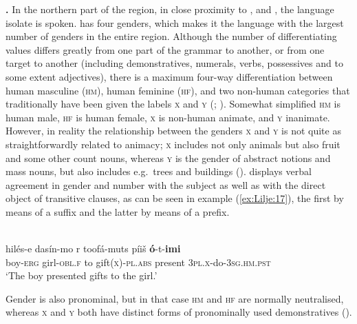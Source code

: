 \documentclass[output=collectionpaper]{langsci/langscibook}
\begin{document}
\textbf{.} In the northern part of the region, in close proximity to  ,   and  , the language isolate  is spoken.  has four genders, which makes it the language with the largest number of genders in the entire region. Although the number of differentiating values differs greatly from one part of the grammar  to another, or from one target to another (including demonstratives, numerals, verbs, possessives and to some extent adjectives), there is a maximum four-way differentiation between human masculine (\textsc{hm}), human feminine (\textsc{hf}), and two non-human categories that traditionally have been given the labels \textsc{x} and \textsc{y} (\citealt[8--9]{Willson1996}; \citealt[33--34]{Berger1998}). Somewhat simplified \textsc{hm} is human male, \textsc{hf} is human female, \textsc{x} is non-human animate, and \textsc{y} inanimate. However, in reality the relationship between the genders \textsc{x} and \textsc{y} is not quite as straightforwardly related to animacy; \textsc{x} includes not only animals but also fruit and some other count nouns, whereas \textsc{y} is the gender of abstract notions and mass nouns, but also includes e.g.\ trees and buildings (\citealt[32--33]{Yoshioka2012}).  displays verbal agreement in gender and number with the subject as well as with the direct object of transitive clauses, as can be seen in example (\ref{ex:Lilje:17}), the first by means of a suffix and the latter by means of a prefix.

\ea
\label{ex:Lilje:17}
 \citep[17]{Willson1996}\\
\gll hilés-e dasín-mo r toofá-muts píiš \textbf{ó}{}-t-\textbf{imi}   \\
boy-\textsc{erg} girl-\textsc{obl.f} to gift\textsc{(x)-pl.abs} present \textsc{3pl.x}{}-do-\textsc{3sg.hm.pst}   \\
\glt `The boy presented gifts to the girl.'
\z

Gender is also pronominal, but in that case \textsc{hm} and \textsc{hf} are normally neutralised, whereas \textsc{x} and \textsc{y} both have distinct forms of pronominally used demonstratives (\citealt[81--82]{Berger1998}).
\end{document}
